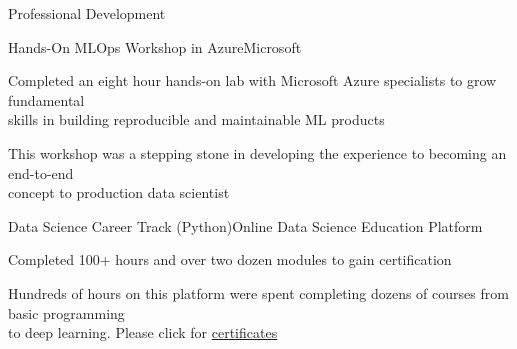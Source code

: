 \documentclass{resume} %
\begin{document}
\begin{rSection}{Professional Development} 

\begin{rSubsection}{Hands-On MLOps Workshop in Azure}{}{Microsoft}{}
\item {Completed an eight hour hands-on lab with Microsoft Azure specialists to grow fundamental \\ skills in building reproducible and maintainable ML products}
\item {This workshop was a stepping stone in developing the experience to becoming an end-to-end \\ concept to production data scientist}
\end{rSubsection}


\begin{rSubsection}{Data Science Career Track (Python)}{}{Online Data Science Education Platform}{}
\item {Completed 100+ hours and over two dozen modules to gain certification}
\item {Hundreds of hours on this platform were spent completing dozens of courses from basic programming \\ to deep learning. Please click for \href{https://github.com/907Resident/Certifications}{certificates}}
\end{rSubsection}




\end{rSection} 
\end{document}
